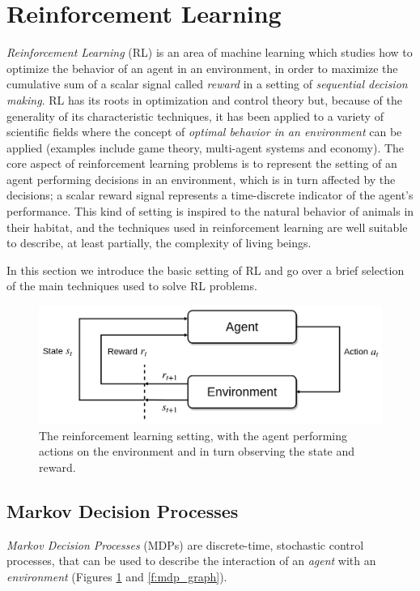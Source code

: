 \section{Reinforcement Learning} \label{s:RL}
\textit{Reinforcement Learning} (RL) is an area of machine learning which
studies how to optimize the behavior of an agent in an environment,
in order to maximize the cumulative sum of a scalar signal called 
\textit{reward} in a setting of \textit{sequential decision making}.
RL has its roots in optimization and control theory but, because of the 
generality of its characteristic techniques, it has been applied to a variety of
scientific fields where the concept of \textit{optimal behavior in an 
environment} can be applied (examples include game theory, multi-agent systems 
and economy).
The core aspect of reinforcement learning problems is to represent the setting
of an agent performing decisions in an environment, which is in turn affected by
the decisions; a scalar reward signal represents a time-discrete indicator of 
the agent's performance. This kind of setting is inspired to the natural 
behavior of animals in their habitat, and the techniques used in reinforcement 
learning are well suitable to describe, at least partially, the complexity of
living beings. 

In this section we introduce the basic setting of RL and go over a brief 
selection of the main techniques used to solve RL problems. 
%
\begin{figure}
    \includegraphics[width=\textwidth]{pictures/reinforcement}
    \centering
    \caption[Reinforcement learning setting]{The reinforcement learning setting, 
	    with the agent performing actions on the environment and in turn 
	    observing the state and reward.}
    \label{f:reinforcement}
\end{figure}
%

\subsection{Markov Decision Processes}
\textit{Markov Decision Processes} (MDPs) are discrete-time, stochastic control 
processes, that can be used to describe the interaction of an \textit{agent} 
with an \textit{environment} (Figures \ref{f:reinforcement} and \ref{f:mdp_graph}).

